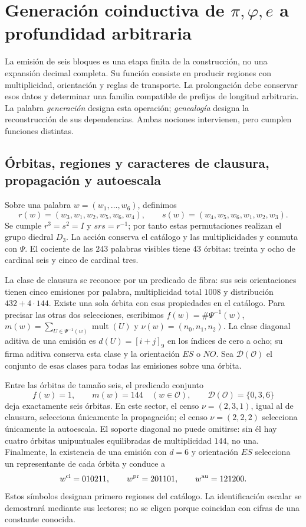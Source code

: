 \section{Generación coinductiva de \texorpdfstring{\(\pi,\varphi,e\)}{pi, phi, e} a profundidad arbitraria}
\label{sec:generacion}

La emisión de seis bloques es una etapa finita de la construcción, no una expansión decimal completa. Su función consiste en producir regiones con multiplicidad, orientación y reglas de transporte. La prolongación debe conservar esos datos y determinar una familia compatible de prefijos de longitud arbitraria. La palabra \emph{generación} designa esta operación; \emph{genealogía} designa la reconstrucción de sus dependencias. Ambas nociones intervienen, pero cumplen funciones distintas.

\subsection{Órbitas, regiones y caracteres de clausura, propagación y autoescala}

Sobre una palabra \(w=(w_1,\ldots,w_6)\), definimos
\[
 r(w)=(w_3,w_1,w_2,w_5,w_6,w_4),\qquad
 s(w)=(w_4,w_5,w_6,w_1,w_2,w_3).
\]
Se cumple \(r^3=s^2=I\) y \(srs=r^{-1}\); por tanto estas permutaciones realizan el grupo diedral \(D_3\). La acción conserva el catálogo y las multiplicidades y conmuta con \(\Psi\). El cociente de las \(243\) palabras visibles tiene \(43\) órbitas: treinta y ocho de cardinal seis y cinco de cardinal tres.

La clase de clausura se reconoce por un predicado de fibra: sus seis orientaciones tienen cinco emisiones por palabra, multiplicidad total \(1008\) y distribución \(432+4\cdot144\). Existe una sola órbita con esas propiedades en el catálogo. Para precisar las otras dos selecciones, escribimos \(f(w)=\#\Psi^{-1}(w)\), \(m(w)=\sum_{U\in\Psi^{-1}(w)}\operatorname{mult}(U)\) y \(\nu(w)=(n_0,n_1,n_2)\). La clase diagonal aditiva de una emisión es \(d(U)=[i+j]_9\) en los índices de cero a ocho; su firma aditiva conserva esta clase y la orientación \(ES\) o \(NO\). Sea \(\mathcal D(\mathcal O)\) el conjunto de esas clases para todas las emisiones sobre una órbita.

Entre las órbitas de tamaño seis, el predicado conjunto
\[
 f(w)=1,\qquad m(w)=144\quad(w\in\mathcal O),\qquad
 \mathcal D(\mathcal O)=\{0,3,6\}
\]
deja exactamente seis órbitas. En este sector, el censo \(\nu=(2,3,1)\), igual al de clausura, selecciona únicamente la propagación; el censo \(\nu=(2,2,2)\) selecciona únicamente la autoescala. El soporte diagonal no puede omitirse: sin él hay cuatro órbitas unipuntuales equilibradas de multiplicidad \(144\), no una. Finalmente, la existencia de una emisión con \(d=6\) y orientación \(ES\) selecciona un representante de cada órbita y conduce a
\begin{equation}
 w^{\rm cl}=010211,\qquad w^{\rm pr}=201101,\qquad w^{\rm au}=121200.
 \label{eq:palabras-regionales}
\end{equation}
Estos símbolos designan primero regiones del catálogo. La identificación escalar se demostrará mediante sus lectores; no se eligen porque coincidan con cifras de una constante conocida.

